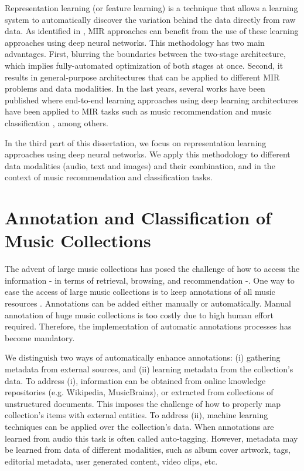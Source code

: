 Representation learning (or feature learning) is a technique that allows a learning system to automatically discover the variation behind the data directly from raw data. As identified in \cite{humphrey2012}, MIR approaches can benefit from the use of these learning approaches using deep neural networks. This methodology has two main advantages. First, blurring the boundaries between the two-stage architecture, which implies fully-automated optimization of both stages at once. Second, it results in general-purpose architectures that can be applied to different MIR problems and data modalities. In the last years, several works have been published where end-to-end learning approaches using deep learning architectures have been applied to MIR tasks such as music recommendation \cite{Oord2013} and music classification \cite{Choi2016}, among others.

In the third part of this dissertation, we focus on representation learning approaches using deep neural networks. We apply this methodology to different data modalities (audio, text and images) and their combination, and in the context of music recommendation and classification tasks.


\section{Annotation and Classification of Music Collections}
\label{sec:intro:annotation}

The advent of large music collections has posed the challenge of how to access the information - in terms of retrieval, browsing, and recommendation -. One way to ease the access of large music collections is to keep annotations of all music resources \cite{sordo2012semantic}. Annotations can be added either manually or automatically. Manual annotation of huge music collections is too costly due to high human effort required. Therefore, the implementation of automatic annotations processes has become mandatory. 

We distinguish two ways of automatically enhance annotations: (i) gathering metadata from external sources, and (ii) learning metadata from the collection's data. To address (i), information can be obtained from online knowledge repositories (e.g. Wikipedia, MusicBrainz), or extracted from collections of unstructured documents. This imposes the challenge of how to properly map collection's items with external entities. To address (ii), machine learning techniques can be applied over the collection's data. When annotations are learned from audio this task is often called auto-tagging. However, metadata may be learned from data of different modalities, such as album cover artwork, tags, editorial metadata, user generated content, video clips, etc.


